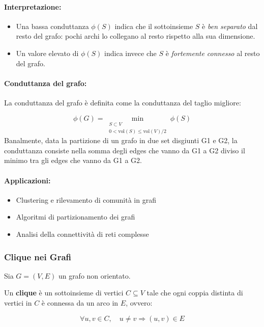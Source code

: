 \paragraph{Interpretazione:}
\begin{itemize}
    \item Una bassa conduttanza \( \phi(S) \) indica che il sottoinsieme \( S \) è \textit{ben separato} dal resto del grafo: pochi archi lo collegano al resto rispetto alla sua dimensione.
    \item Un valore elevato di \( \phi(S) \) indica invece che \( S \) è \textit{fortemente connesso} al resto del grafo.
\end{itemize}

\paragraph{Conduttanza del grafo:}

La conduttanza del grafo è definita come la conduttanza del taglio migliore:

\[
\phi(G) = \min_{\substack{S \subset V \\ 0 < \mathrm{vol}(S) \leq \mathrm{vol}(V)/2}} \phi(S)
\]
Banalmente, data la partizione di un grafo in due set disgiunti G1 e G2, la conduttanza consiste nella somma degli edges che vanno da G1 a G2 diviso il minimo tra gli edges che vanno da G1 a G2. 
\paragraph{Applicazioni:}
\begin{itemize}
    \item Clustering e rilevamento di comunità in grafi
    \item Algoritmi di partizionamento dei grafi
    \item Analisi della connettività di reti complesse
\end{itemize}

\subsubsection*{Clique nei Grafi}

Sia \( G = (V, E) \) un grafo non orientato.

Un \textbf{clique} è un sottoinsieme di vertici \( C \subseteq V \) tale che ogni coppia distinta di vertici in \( C \) è connessa da un arco in \( E \), ovvero:

\[
\forall u, v \in C, \quad u \neq v \Rightarrow (u,v) \in E
\]

